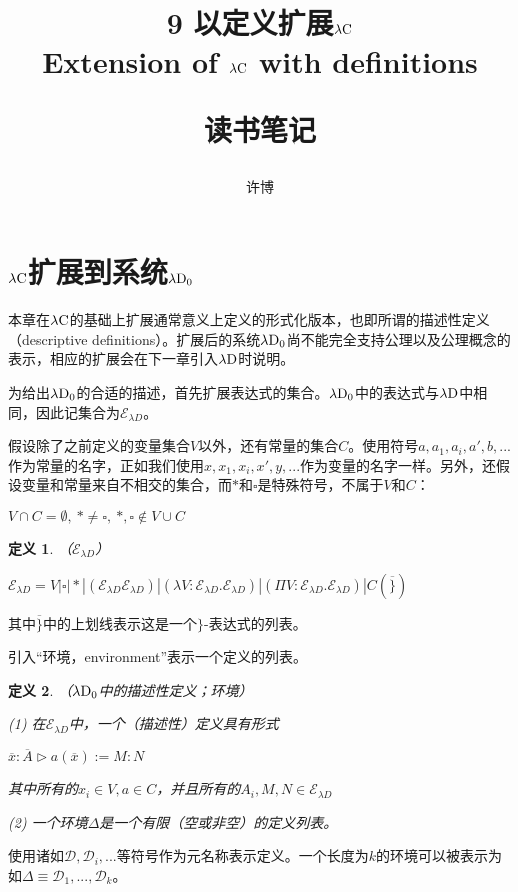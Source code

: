 \documentclass[UTF8]{article}
\title{9 以定义扩展$\lambda{\rm C}$\\Extension of $\lambda{\rm C}$ with definitions\\[2ex]\begin{large}读书笔记\end{large}}
\author{许博}
\date{}
\newtheorem{thm}{定义}[section]
\begin{document}
\maketitle
	\section{$\lambda{\rm C}$扩展到系统$\lambda{\rm D_0}$}
	\noindent
	本章在$\lambda{\rm C}$的基础上扩展通常意义上定义的形式化版本，也即所谓的描述性定义（descriptive definitions）。扩展后的系统$\lambda{\rm D_0}$尚不能完全支持公理以及公理概念的表示，相应的扩展会在下一章引入$\lambda{\rm D}$时说明。
	
		为给出$\lambda{\rm D_0}$的合适的描述，首先扩展表达式的集合。$\lambda{\rm D_0}$中的表达式与$\lambda{\rm D}$中相同，因此记集合为$\mathcal{E}_{\lambda{D}}$。
		
		假设除了之前定义的变量集合$V$以外，还有常量的集合$C$。使用符号$a,a_1,a_i,a',b,...$作为常量的名字，正如我们使用$x,x_1,x_i,x',y,...$作为变量的名字一样。另外，还假设变量和常量来自不相交的集合，而$*$和$\square$是特殊符号，不属于$V$和$C$：
		
		$V\cap C=\emptyset,\ *\not=\square,\ *,\square\notin V\cup C$
		
		\begin{thm}（$\mathcal{E}_{\lambda{D}}$）
			
			$\mathcal{E}_{\lambda{D}}=V|\square|*|(\mathcal{E}_{\lambda{D}}\mathcal{E}_{\lambda{D}})|(\lambda V:\mathcal{E}_{\lambda{D}}.\mathcal{E}_{\lambda{D}})|(\Pi V:\mathcal{E}_{\lambda{D}}.\mathcal{E}_{\lambda{D}})|C(\overline{\}})$
		\end{thm}
	
		其中$\overline{\}}$中的上划线表示这是一个$\}$-表达式的列表。
		
		引入“环境，environment”表示一个定义的列表。
		
		\begin{thm}（$\lambda{\rm D_0}$中的描述性定义；环境）
			
			\noindent
			(1) 在$\mathcal{E}_{\lambda{D}}$中，一个（描述性）定义具有形式
			
			$\overline{x}:\overline{A}\triangleright a(\overline{x}):=M:N$
			
			\noindent
			其中所有的$x_i\in V,a\in C$，并且所有的$A_i,M,N\in\mathcal{E}_{\lambda{D}}$
			
			\noindent
			(2) 一个环境$\Delta$是一个有限（空或非空）的定义列表。
		\end{thm}
	
		使用诸如$\mathcal{D},\mathcal{D}_i,...$等符号作为元名称表示定义。一个长度为$k$的环境可以被表示为如$\Delta\equiv\mathcal{D}_1,...,\mathcal{D}_k$。
		
\end{document}
